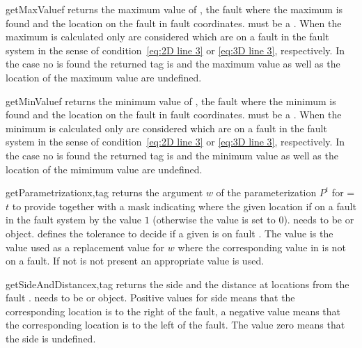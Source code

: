\begin{methoddesc}[FaultSystem]{getMaxValue}{f}
returns the maximum value of , the fault where the maximum is found and the location on the fault in fault coordinates.  must be a \Scalar. When the maximum is calculated only \DataSamplePoints are considered
which are on a fault in the fault system in the sense of condition~\ref{eq:2D line 3} or \ref{eq:3D line 3}, respectively. In the case no \DataSamplePoints is found the returned tag is  and
the maximum value as well as the location of the maximum value are undefined.
\end{methoddesc}

\begin{methoddesc}[FaultSystem]{getMinValue}{f}
returns the minimum value of , the fault where the minimum is found and the location on the fault in fault coordinates.  must be a \Scalar. When the minimum is calculated only \DataSamplePoints are considered
which are on a fault in the fault system in the sense of condition~\ref{eq:2D line 3} or \ref{eq:3D line 3}, respectively. In the case no \DataSamplePoints is found the returned tag is  and
the minimum value as well as the location of the mimimum value are undefined.
\end{methoddesc}

\begin{methoddesc}[FaultSystem]{getParametrization}{x,tag }
returns the argument $w$ of the parameterization $P^t$ for =$t$ to provide 
together with a mask indicating where the given location if on a fault in the fault system by the value $1$ (otherwise the value is set to $0$).  needs to be \Vector or \numpyNDA object.  defines the tolerance to decide if a given \DataSamplePoints is on fault . The value
 is the value used as a replacement value for $w$ where the corresponding value in  is not 
on a fault. If not  is not present an appropriate value is used.
\end{methoddesc}
 
\begin{methoddesc}[FaultSystem]{getSideAndDistance}{x,tag}
returns the side and the distance at locations  from the fault .
 needs to be \Vector or \numpyNDA object. Positive values for side means that the corresponding location is 
to the right of the fault, a negative value means that the corresponding location is 
to the left of the fault. The value zero means that the side is undefined.
\end{methoddesc}




